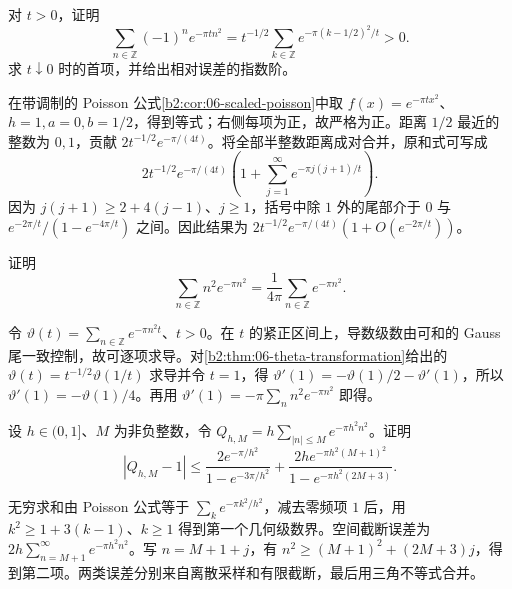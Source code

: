 \begin{exercise}\label{b2:ex:06-alternating-theta}
对 \(t>0\)，证明
\[
 \sum_{n\in\mathbb Z}(-1)^ne^{-\pi tn^2}
 =t^{-1/2}\sum_{k\in\mathbb Z}e^{-\pi(k-1/2)^2/t}>0.
\]
求 \(t\downarrow0\) 时的首项，并给出相对误差的指数阶。
\end{exercise}
\begin{solution}
在带调制的 Poisson 公式\cref{b2:cor:06-scaled-poisson}中取 \(f(x)=e^{-\pi tx^2}\)、\(h=1,a=0,b=1/2\)，得到等式；右侧每项为正，故严格为正。距离 \(1/2\) 最近的整数为 \(0,1\)，贡献 \(2t^{-1/2}e^{-\pi/(4t)}\)。将全部半整数距离成对合并，原和式可写成
\[
 2t^{-1/2}e^{-\pi/(4t)}
 \left(1+\sum_{j=1}^\infty e^{-\pi j(j+1)/t}\right).
\]
因为 \(j(j+1)\geq2+4(j-1)\)、\(j\geq1\)，括号中除 \(1\) 外的尾部介于 \(0\) 与 \(e^{-2\pi/t}/(1-e^{-4\pi/t})\) 之间。因此结果为 \(2t^{-1/2}e^{-\pi/(4t)}(1+O(e^{-2\pi/t}))\)。
\end{solution}

\begin{exercise}\label{b2:ex:06-theta-derivative}
证明
\[
 \sum_{n\in\mathbb Z}n^2e^{-\pi n^2}
 =\dfrac1{4\pi}\sum_{n\in\mathbb Z}e^{-\pi n^2}.
\]
\end{exercise}
\begin{solution}
令 \(\vartheta(t)=\sum_{n\in\mathbb Z}e^{-\pi n^2t}\)、\(t>0\)。在 \(t\) 的紧正区间上，导数级数由可和的 Gauss 尾一致控制，故可逐项求导。对\cref{b2:thm:06-theta-transformation}给出的 \(\vartheta(t)=t^{-1/2}\vartheta(1/t)\) 求导并令 \(t=1\)，得 \(\vartheta'(1)=-\vartheta(1)/2-\vartheta'(1)\)，所以 \(\vartheta'(1)=-\vartheta(1)/4\)。再用 \(\vartheta'(1)=-\pi\sum_nn^2e^{-\pi n^2}\) 即得。
\end{solution}

\begin{exercise}\label{b2:ex:06-quadrature-error}
设 \(h\in(0,1]\)、\(M\) 为非负整数，令 \(Q_{h,M}=h\sum_{|n|\leq M}e^{-\pi h^2n^2}\)。证明
\[
 |Q_{h,M}-1|
 \leq\dfrac{2e^{-\pi/h^2}}{1-e^{-3\pi/h^2}}
 +\dfrac{2h e^{-\pi h^2(M+1)^2}}{1-e^{-\pi h^2(2M+3)}}.
\]
\end{exercise}
\begin{solution}
无穷求和由 Poisson 公式等于 \(\sum_ke^{-\pi k^2/h^2}\)，减去零频项 \(1\) 后，用 \(k^2\geq1+3(k-1)\)、\(k\geq1\) 得到第一个几何级数界。空间截断误差为 \(2h\sum_{n=M+1}^\infty e^{-\pi h^2n^2}\)。写 \(n=M+1+j\)，有 \(n^2\geq(M+1)^2+(2M+3)j\)，得到第二项。两类误差分别来自离散采样和有限截断，最后用三角不等式合并。
\end{solution}

